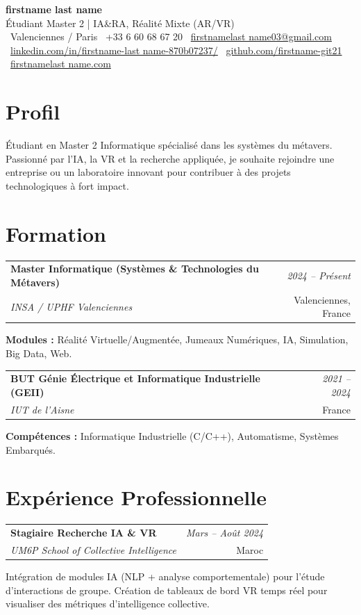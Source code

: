 \documentclass[10pt, varwidth=18.6cm, border=1.2cm]{standalone}
\makeatletter
\newcommand{\entry}[4]{
  \vspace{2pt}
  \noindent
  \begin{tabular*}{\textwidth}{@{\extracolsep{\fill}}lr}
    \textbf{#1} & \textit{#2} \\
    \textit{#3} & \small #4 \\
  \end{tabular*}
  \vspace{4pt}
}
\makeatother
\begin{document}
\pagestyle{empty}

\begin{center}
    {\Huge \textbf{firstname last name}} \\[4pt]
    {\Large Étudiant Master 2 | IA\&RA, Réalité Mixte (AR/VR)} \\[6pt]
    \small
    \faMapMarker* \ Valenciennes / Paris \quad
    \faPhone \ +33 6 60 68 67 20 \quad
    \faEnvelope \ \href{mailto:firstnamelast name03@gmail.com}{firstnamelast name03@gmail.com} \\
    \faLinkedin \ \href{https://www.linkedin.com/in/firstname-last name-870b07237/}{linkedin.com/in/firstname-last name-870b07237/} \quad
    \faGithub \ \href{https://github.com/firstname-git21}{github.com/firstname-git21} \quad
    \faGlobe \ \href{https://firstnamelast name.com}{firstnamelast name.com}
\end{center}

\section{Profil}
Étudiant en Master 2 Informatique spécialisé dans les systèmes du métavers. Passionné par l'IA, la VR et la recherche appliquée, je souhaite rejoindre une entreprise ou un laboratoire innovant pour contribuer à des projets technologiques à fort impact.

\section{Formation}

\entry{Master Informatique (Systèmes \& Technologies du Métavers)}{2024 -- Présent}{INSA / UPHF Valenciennes}{Valenciennes, France}
\textbf{Modules :} Réalité Virtuelle/Augmentée, Jumeaux Numériques, IA, Simulation, Big Data, Web.

\entry{BUT Génie Électrique et Informatique Industrielle (GEII)}{2021 -- 2024}{IUT de l'Aisne}{France}
\textbf{Compétences :} Informatique Industrielle (C/C++), Automatisme, Systèmes Embarqués.

\section{Expérience Professionnelle}

\entry{Stagiaire Recherche IA \& VR}{Mars -- Août 2024}{UM6P School of Collective Intelligence}{Maroc}
Intégration de modules IA (NLP + analyse comportementale) pour l'étude d’interactions de groupe.  
Création de tableaux de bord VR temps réel pour visualiser des métriques d'intelligence collective.
\end{document}
